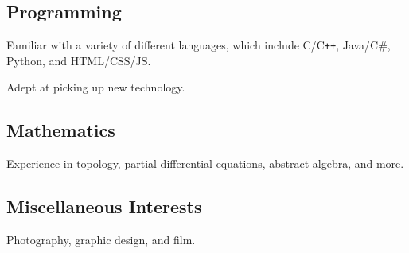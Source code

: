 \documentclass[11pt]{article}
\begin{document}
\begin{multicols}{2}
  \subsection*{Programming}
  Familiar with a variety of different languages, which include C/C{}\verb!++!, Java/C\#, Python, and HTML/CSS/JS.

  Adept at picking up new technology.

  \subsection*{Mathematics}
  Experience in topology, partial differential equations, abstract algebra, and more.

  \subsection*{Miscellaneous Interests}
  Photography, graphic design, and film.

\end{multicols}
\end{document}

